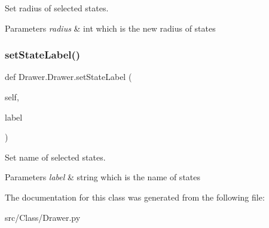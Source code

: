Set radius of selected states. 


\begin{DoxyParams}{Parameters}
{\em radius} & int which is the new radius of states \\
\hline
\end{DoxyParams}
\mbox{\label{classDrawer_1_1Drawer_ad77bf08e11c3d86b7bdd8bc49cfbb0f5}} 
\subsubsection{\texorpdfstring{setStateLabel()}{setStateLabel()}}
{\footnotesize\ttfamily def Drawer.\+Drawer.\+set\+State\+Label (\begin{DoxyParamCaption}\item[{}]{self,  }\item[{}]{label }\end{DoxyParamCaption})}



Set name of selected states. 


\begin{DoxyParams}{Parameters}
{\em label} & string which is the name of states \\
\hline
\end{DoxyParams}


The documentation for this class was generated from the following file\+:\begin{DoxyCompactItemize}
\item 
src/\+Class/Drawer.\+py\end{DoxyCompactItemize}
